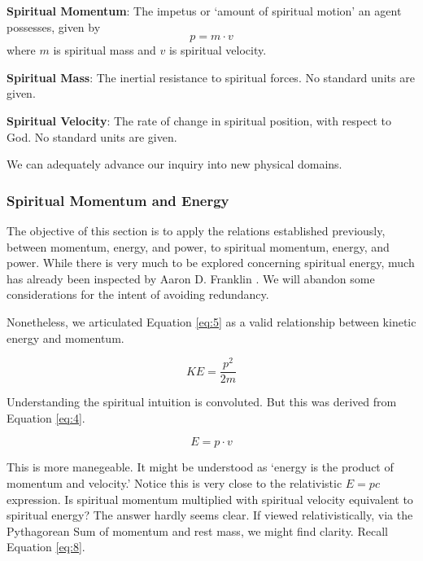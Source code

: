 \documentclass{article}
\begin{document}
                \begin{center}
                  
                    \textbf{Spiritual Momentum}: The impetus or `amount of spiritual motion' an agent possesses, given by
                    \[p = m\cdot v\] 
                    where $m$ is spiritual mass and $v$ is spiritual velocity.

                    \textbf{Spiritual Mass}: The inertial resistance to spiritual forces. No standard units are given.

                    \textbf{Spiritual Velocity}: The rate of change in spiritual position, with respect to God. No standard units are given.
                    
                \end{center}
                
                We can adequately advance our inquiry into new physical domains. 

            \subsubsection{Spiritual Momentum and Energy}
                The objective of this section is to apply the relations established previously, between momentum, energy, and power, to spiritual momentum, energy, and power.
                While there is very much to be explored concerning spiritual energy, much has already been inspected by Aaron D. Franklin \cite{Franklin}. We will abandon some considerations for the intent of avoiding redundancy.

                Nonetheless, we articulated Equation \ref{eq:5} as a valid relationship between kinetic energy and momentum.

                \[KE = \dfrac{p^2}{2m}\]

                Understanding the spiritual intuition is convoluted. But this was derived from Equation \ref{eq:4}.

                \[E = p\cdot v\]
                
                This is more manegeable. It might be understood as `energy is the product of momentum and velocity.' Notice this is very close to the relativistic $E = pc$ expression.
                Is spiritual momentum multiplied with spiritual velocity equivalent to spiritual energy? The answer hardly seems clear. 
                If viewed relativistically, via the Pythagorean Sum of momentum and rest mass, we might find clarity. Recall Equation \ref{eq:8}.
\end{document}
